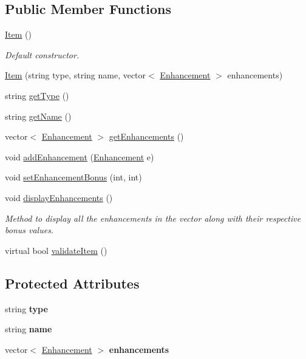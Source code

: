 \subsection*{Public Member Functions}
\begin{DoxyCompactItemize}
\item 
\hypertarget{class_item_a297720c02984eab37332ae795d22189d}{}\label{class_item_a297720c02984eab37332ae795d22189d} 
\hyperlink{class_item_a297720c02984eab37332ae795d22189d}{Item} ()
\begin{DoxyCompactList}\small\item\em Default constructor. \end{DoxyCompactList}\item 
\hyperlink{class_item_aa758d9160941f18ca7be38bc3835d5b9}{Item} (string type, string name, vector$<$ \hyperlink{class_enhancement}{Enhancement} $>$ enhancements)
\item 
string \hyperlink{class_item_a2aea1cc560205b01eaf5250c21f4fc71}{get\+Type} ()
\item 
string \hyperlink{class_item_a63d7f2148b699e539aae354b01559811}{get\+Name} ()
\item 
vector$<$ \hyperlink{class_enhancement}{Enhancement} $>$ \hyperlink{class_item_abf06eb8a8f73633c4c7c922073a754b8}{get\+Enhancements} ()
\item 
void \hyperlink{class_item_a5827bb049b61a0a95e448607d1247914}{add\+Enhancement} (\hyperlink{class_enhancement}{Enhancement} e)
\item 
void \hyperlink{class_item_a31da3e0fed93e6bcf2402e2c65259c2e}{set\+Enhancement\+Bonus} (int, int)
\item 
\hypertarget{class_item_a7be8022e6fe1a00d0fae058161d94977}{}\label{class_item_a7be8022e6fe1a00d0fae058161d94977} 
void \hyperlink{class_item_a7be8022e6fe1a00d0fae058161d94977}{display\+Enhancements} ()
\begin{DoxyCompactList}\small\item\em Method to display all the enhancements in the vector along with their respective bonus values. \end{DoxyCompactList}\item 
virtual bool \hyperlink{class_item_a6603371b60aaded48f697975c81fc25b}{validate\+Item} ()
\end{DoxyCompactItemize}
\subsection*{Protected Attributes}
\begin{DoxyCompactItemize}
\item 
\hypertarget{class_item_a5fddc3cf5f552ab8f5cceacaba430474}{}\label{class_item_a5fddc3cf5f552ab8f5cceacaba430474} 
string {\bfseries type}
\item 
\hypertarget{class_item_a406cde7962a6b42a66b4a53c9a26db2c}{}\label{class_item_a406cde7962a6b42a66b4a53c9a26db2c} 
string {\bfseries name}
\item 
\hypertarget{class_item_a0bc10f489737df2323ef72b2b225d504}{}\label{class_item_a0bc10f489737df2323ef72b2b225d504} 
vector$<$ \hyperlink{class_enhancement}{Enhancement} $>$ {\bfseries enhancements}
\end{DoxyCompactItemize}
